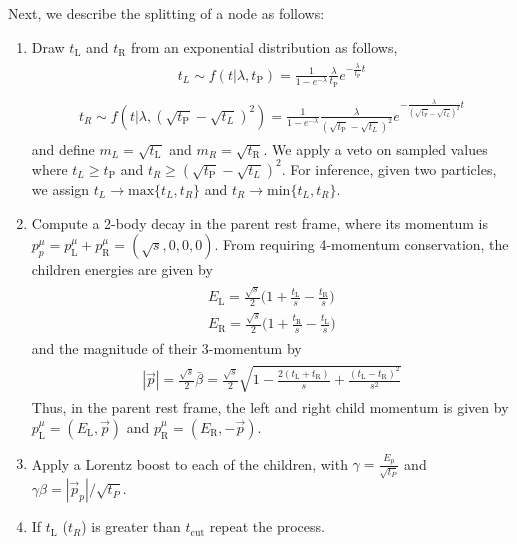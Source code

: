 \documentclass[12pt]{article}
\newcommand{\bea}{\begin{eqnarray}\begin{aligned}}
\newcommand{\eea}{\end{aligned}\end{eqnarray}}
\begin{document}
Next, we describe the splitting of a node as follows:
\begin{enumerate}

\item Draw $ t_{\text{L}}$ and  $t_{\text{R}}$ from an exponential distribution as follows,
\bea \label{eq:exponential1}
t_L \sim f(t | \lambda, t_{\text{P}})=\frac{1}{1-e^{- \lambda}} \frac{\lambda}{t_{\text{P}}} e^{- \frac{\lambda}{ t_{\text{P}}} t} 
\eea
\bea \label{eq:exponential2}
t_R \sim f(t | \lambda, (\sqrt{t_{\text{P}}}-\sqrt{t_L})^2)= \frac{1}{1-e^{- \lambda}} \frac{\lambda}{ (\sqrt{t_{\text{P}}}-\sqrt{t_L})^2} e^{- \frac{\lambda}{ (\sqrt{t_{\text{P}}}-\sqrt{t_L})^2} t} 
\eea
and  define $m_L=\sqrt{t_\text{L}}$ and $m_R=\sqrt{t_\text{R}}$. We apply a veto on sampled values where $t_L  \geqslant t_{\text{P}}$ and $t_R \geqslant (\sqrt{t_{\text{P}}}-\sqrt{t_L})^2$. For inference, given two particles, we assign $t_L \rightarrow \text{max}\{t_L, t_R\} $ and $t_R \rightarrow \text{min}\{t_L, t_R\} $.


\item Compute a 2-body decay in the parent rest frame, where its momentum is $p^\mu_p=p^\mu_{\text{L}}+p^\mu_{\text{R}}=(\sqrt{s}, 0, 0, 0)$. From requiring 4-momentum conservation, the children energies are given by
\bea
E_{\text{L}}=\frac{\sqrt{s}}{2}\bigg(1+\frac{t_{\text{L}}}{s}-\frac{t_{\text{R}}}{s} \bigg) \\
E_{\text{R}}=\frac{\sqrt{s}}{2}\bigg(1+\frac{t_{\text{R}}}{s}-\frac{t_{\text{L}}}{s} \bigg)
\eea
and the magnitude of their 3-momentum by
\bea\label{eq:Prestframe}
|\vec{p}| =\frac{\sqrt{s}}{2} \bar{\beta}=\frac{\sqrt{s}}{2} \sqrt{1-\frac{2 (t_{\text{L}}+t_{\text{R}})}{s}+\frac{(t_{\text{L}}-t_{\text{R}})^2}{s^2}}
\eea
Thus, in the parent rest frame, the left and right child momentum is given by $p^\mu_\text{L}=(E_{\text{L}},\vec{p})$ and $p^\mu_\text{R}=(E_{\text{R}},-\vec{p})$. 

\item Apply a Lorentz boost to each of the children, with $\gamma=\frac{E_p}{\sqrt{t_P}}$ and $\gamma \beta = |\vec{p}_p|/\sqrt{t_P}$. 

\item If $t_{\text{L}}$ ($t_{R}$) is greater than  $t_\text{cut}$ repeat the process.

\end{enumerate}
\end{document}
